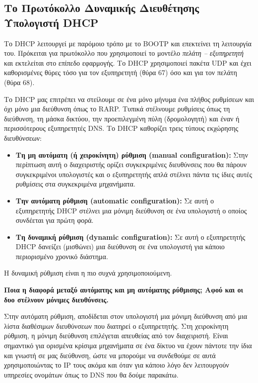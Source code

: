 %
%
\setcounter{subsection}{1}
\subsection{Το Πρωτόκολλο Δυναμικής Διευθέτησης Υπολογιστή DHCP}

Το DHCP λειτουργεί με παρόμοιο τρόπο με το BOOTP και επεκτείνει τη λειτουργία του. Πρόκειται για πρωτόκολλο που χρησιμοποιεί το μοντέλο \emph{πελάτη -- εξυπηρετητή} και εκτελείται στο επίπεδο εφαρμογής. Το DHCP χρησιμοποιεί πακέτα UDP και έχει καθορισμένες θύρες τόσο για τον εξυπηρετητή (θύρα 67) όσο και για τον πελάτη (θύρα 68).

Το DHCP μας επιτρέπει να στείλουμε σε ένα μόνο  μήνυμα ένα πλήθος ρυθμίσεων και όχι μόνο μια διεύθυνση όπως το RARP. Τυπικά στέλνουμε ρυθμίσεις όπως τη διεύθυνση, τη μάσκα δικτύου, την προεπιλεγμένη πύλη (δρομολογητή) και έναν ή περισσότερους εξυπηρετητές DNS. Το DHCP καθορίζει τρεις τύπους εκχώρησης διευθύνσεων:

\begin{itemize}
\item \textbf{Τη μη αυτόματη (ή χειροκίνητη) ρύθμιση (manual configuration):} Στην περίπτωση αυτή ο διαχειριστής ορίζει συγκεκριμένες διευθύνσεις που θα πάρουν συγκεκριμένοι υπολογιστές και ο εξυπηρετητής απλά στέλνει πάντα τις ίδιες αυτές ρυθμίσεις στα συγκεκριμένα μηχανήματα.
\item \textbf{Την αυτόματη ρύθμιση (automatic configuration):} Σε αυτή ο εξυπηρετητής DHCP στέλνει μια μόνιμη διεύθυνση σε ένα υπολογιστή ο οποίος συνδέεται για πρώτη φορά.
\item \textbf{Τη δυναμική ρύθμιση (dynamic configuration):} Σε αυτή ο εξυπηρετητής DHCP δανείζει (μισθώνει) μια διεύθυνση σε ένα υπολογιστή για κάποιο περιορισμένο χρονικό διάστημα.
\end{itemize}

Η δυναμική ρύθμιση είναι η πιο συχνά χρησιμοποιούμενη.

\begin{inthebox}
\textbf{Ποια η διαφορά μεταξύ αυτόματης και μη αυτόματης ρύθμισης; Αφού και οι δυο στέλνουν μόνιμες διευθύνσεις.}

Στην αυτόματη ρύθμιση, αποδίδεται στον υπολογιστή μια μόνιμη διεύθυνση από μια λίστα διαθέσιμων διευθύνσεων που διατηρεί ο εξυπηρετητής. Στη χειροκίνητη ρύθμιση, η μόνιμη διεύθυνση επιλέγεται απευθείας από τον διαχειριστή. Είναι σημαντικό για ορισμένα κρίσιμα μηχανήματα σε ένα δίκτυο να έχουν πάντοτε την ίδια και γνωστή σε μας διεύθυνση, ώστε να μπορούμε να συνδεθούμε σε αυτά χρησιμοποιώντας το IP τους ακόμα και όταν για κάποιο λόγο δεν λειτουργούν υπηρεσίες ονομάτων όπως το DNS που θα δούμε παρακάτω.\\
\end{inthebox}

